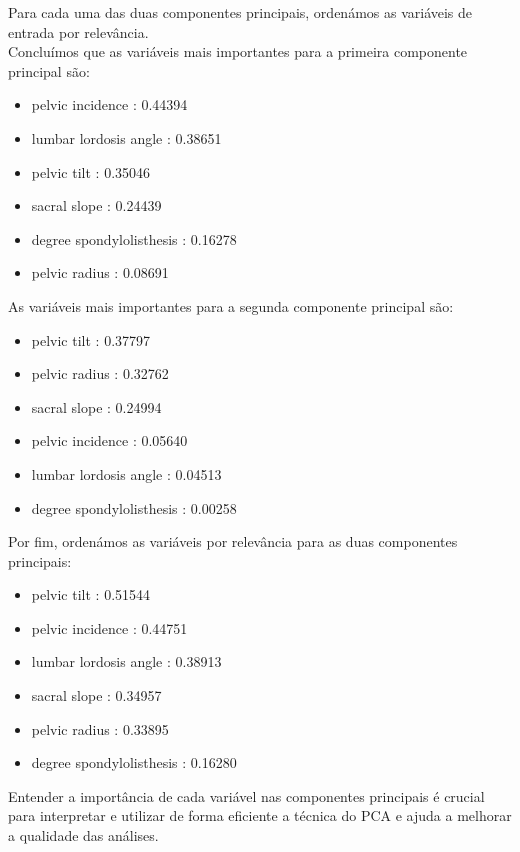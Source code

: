 \documentclass[a4paper,12pt]{article} %
\begin{document}
\begin{enumerate}
Para cada uma das duas componentes principais, ordenámos as variáveis de entrada por relevância. \\

Concluímos que as variáveis mais importantes para a primeira componente principal são: 
\begin{itemize}
    \item pelvic incidence :  0.44394
    \item lumbar lordosis angle :  0.38651
    \item pelvic tilt :  0.35046
    \item sacral slope :  0.24439
    \item degree spondylolisthesis :  0.16278
    \item pelvic radius :  0.08691
\end{itemize}

As variáveis mais importantes para a segunda componente principal são: 
\begin{itemize}
    \item pelvic tilt :  0.37797
    \item pelvic radius :  0.32762
    \item sacral slope :  0.24994
    \item pelvic incidence :  0.05640
    \item lumbar lordosis angle :  0.04513
    \item degree spondylolisthesis :  0.00258
\end{itemize}

Por fim, ordenámos as variáveis por relevância para as duas componentes principais: 
\begin{itemize}    
    \item pelvic tilt :  0.51544
    \item pelvic incidence :  0.44751
    \item lumbar lordosis angle :  0.38913
    \item sacral slope :  0.34957
    \item pelvic radius :  0.33895
    \item degree spondylolisthesis :  0.16280 \\
\end{itemize} 

Entender a importância de cada variável nas componentes principais é crucial para interpretar e 
utilizar de forma eficiente a técnica do PCA e ajuda a melhorar a qualidade das análises. \\


\end{enumerate}
\end{document}
